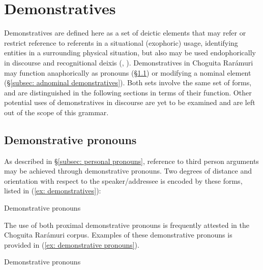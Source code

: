 

\section{Demonstratives}
\label{sec:10:demonstratives}

Demonstratives are defined here as a set of deictic elements that may refer or restrict reference to referents in a situational (exophoric) usage, identifying entities in a surrounding physical situation, but also may be used endophorically  in discourse and recognitional deixis (\citealt{himmelmann1996demonstratives}, \citealt{enfield2003demonstratives}). Demonstratives in Choguita Rarámuri may function anaphorically as pronouns (§\ref{subsec: demonstrative pronouns}) or modifying a nominal element (§\ref{subsec: adnominal demonstratives}). Both sets involve the same set of forms, and are distinguished in the following sections in terms of their function. Other potential uses of demonstratives in discourse are yet to be examined and are left out of the scope of this grammar.

\subsection{Demonstrative pronouns}
\label{subsec: demonstrative pronouns}

As described in §\ref{subsec: personal pronouns}, reference to third person arguments may be achieved through demonstrative pronouns. Two degrees of distance and orientation with respect to the speaker/addressee is encoded by these forms, listed in (\ref{ex: demonstratives}):

\ea\label{ex: demonstratives}
{Demonstrative pronouns}

    \z
\z

The use of both proximal demonstrative pronouns is frequently attested in the Choguita Rarámuri corpus. Examples of these demonstrative pronouns is provided in (\ref{ex: demonstrative pronouns}).

\ea\label{ex: demonstrative pronouns}
{Demonstrative pronouns}

